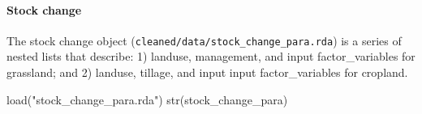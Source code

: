 \documentclass[
]{article}
\newenvironment{Shaded}{\begin{snugshade}}{\end{snugshade}}
\newcommand{\FunctionTok}[1]{\textcolor[rgb]{0.00,0.00,0.00}{#1}}
\newcommand{\NormalTok}[1]{#1}
\newcommand{\StringTok}[1]{\textcolor[rgb]{0.31,0.60,0.02}{#1}}
\begin{document}
\hypertarget{stock-change}{%
\paragraph{Stock change}\label{stock-change}}

The stock change object (\texttt{cleaned/data/stock\_change\_para.rda})
is a series of nested lists that describe: 1) landuse, management, and
input factor\_variables for grassland; and 2) landuse, tillage, and
input input factor\_variables for cropland.

\begin{Shaded}
\begin{Highlighting}[]
\FunctionTok{load}\NormalTok{(}\StringTok{"stock\_change\_para.rda"}\NormalTok{)}
\FunctionTok{str}\NormalTok{(stock\_change\_para)}
\end{Highlighting}
\end{Shaded}
\end{document}
